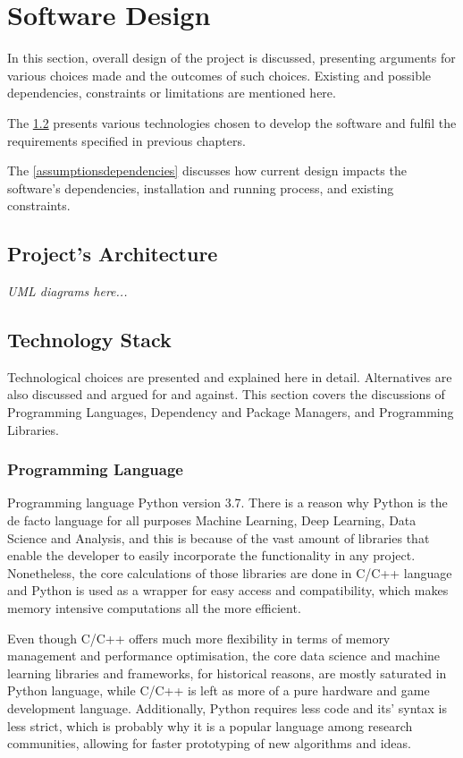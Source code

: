 \section{Software Design}
    In this section, overall design of the project is discussed, presenting arguments for various choices made and the outcomes of such choices. Existing and possible dependencies, constraints or limitations are mentioned here.
    
    The \cref{techstack} presents various technologies chosen to develop the software and fulfil the requirements specified in previous chapters.
    
    The \cref{assumptionsdependencies} discusses how current design impacts the software's dependencies, installation and running process, and existing constraints.
    
    \subsection{Project's Architecture} \label{architecture}
        \textit{UML diagrams here...}
    
    \subsection{Technology Stack} \label{techstack}
        Technological choices are presented and explained here in detail. Alternatives are also discussed and argued for and against. This section covers the discussions of Programming Languages, Dependency and Package Managers, and Programming Libraries.
        
        \subsubsection{Programming Language}
            Programming language Python version 3.7. There is a reason why Python is the de facto language for all purposes Machine Learning, Deep Learning, Data Science and Analysis, and this is because of the vast amount of libraries that enable the developer to easily incorporate the functionality in any project. Nonetheless, the core calculations of those libraries are done in C/C++ language and Python is used as a wrapper for easy access and compatibility, which makes memory intensive computations all the more efficient. 
            
            Even though C/C++ offers much more flexibility in terms of memory management and performance optimisation, the core data science and machine learning libraries and frameworks, for historical reasons, are mostly saturated in Python language, while C/C++ is left as more of a pure hardware and game development language. Additionally, Python requires less code and its' syntax is less strict, which is probably why it is a popular language among research communities, allowing for faster prototyping of new algorithms and ideas.
            
